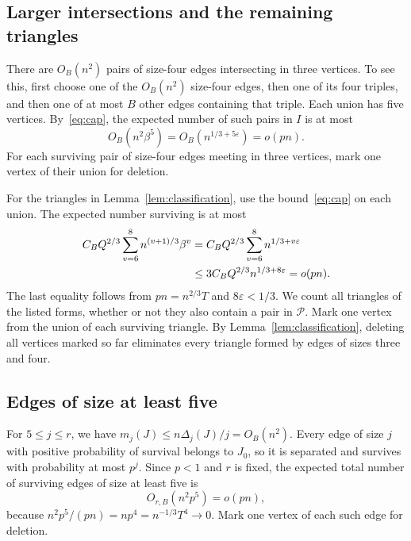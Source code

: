 \documentclass[11pt]{article}
\numberwithin{equation}{section}
\theoremstyle{remark}
\begin{document}
\subsection{Larger intersections and the remaining triangles}
There are $O_B(n^2)$ pairs of size-four edges intersecting in three vertices. To see this, first choose one of the $O_B(n^2)$ size-four edges, then one of its four triples, and then one of at most $B$ other edges containing that triple. Each union has five vertices. By~\eqref{eq:cap}, the expected number of such pairs in $I$ is at most
\begin{equation}\label{eq:overlap3-loss}
 O_B(n^2\beta^5)=O_B(n^{1/3+5\varepsilon})=o(pn).
\end{equation}
For each surviving pair of size-four edges meeting in three vertices, mark one vertex of their union for deletion.

For the triangles in Lemma~\ref{lem:classification}, use the bound~\eqref{eq:cap} on each union. The expected number surviving is at most
\begin{align}
 C_BQ^{2/3}\sum_{v=6}^8n^{(v+1)/3}\beta^v
 &=C_BQ^{2/3}\sum_{v=6}^8n^{1/3+v\varepsilon}\notag\\
 &\le3C_BQ^{2/3}n^{1/3+8\varepsilon}
 =o(pn).\label{eq:other-triangle-loss}
\end{align}
The last equality follows from $pn=n^{2/3}T$ and $8\varepsilon<1/3$. We count all triangles of the listed forms, whether or not they also contain a pair in $\mathcal P$. Mark one vertex from the union of each surviving triangle. By Lemma~\ref{lem:classification}, deleting all vertices marked so far eliminates every triangle formed by edges of sizes three and four.

\subsection{Edges of size at least five}
For $5\le j\le r$, we have $m_j(J)\le n\Delta_j(J)/j=O_B(n^2)$. Every edge of size $j$ with positive probability of survival belongs to $J_0$, so it is separated and survives with probability at most $p^j$. Since $p<1$ and $r$ is fixed, the expected total number of surviving edges of size at least five is
\begin{equation}\label{eq:large-edge-loss}
 O_{r,B}(n^2p^5)=o(pn),
\end{equation}
because $n^2p^5/(pn)=np^4=n^{-1/3}T^4\to0$. Mark one vertex of each such edge for deletion.
\end{document}
